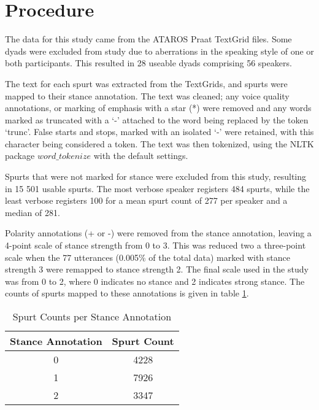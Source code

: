 \section{Procedure} 

The data for this study came from the ATAROS Praat \citep{boersma2002praat} TextGrid files.  Some dyads were excluded from study due to aberrations in the speaking style of one or both participants.  This resulted in 28 useable dyads comprising 56 speakers. 

The text for each spurt was extracted from the TextGrids, and spurts were mapped to their stance annotation.  The text was cleaned; any voice quality annotations, or marking of emphasis with a star (*) were removed and any words marked as truncated with a `-' attached to the word being replaced by the token `trunc'.  False starts and stops, marked with an isolated `-' were retained, with this character being considered a token.  The text was then tokenized, using the NLTK \citep{loper2005natural} package $word\_tokenize$  with the default settings.  

Spurts that were not marked for stance were excluded from this study, resulting in 15 501 usable spurts.  The most verbose speaker registers 484 spurts, while the least verbose registers 100 for a mean spurt count of 277 per speaker and a median of 281.

Polarity annotations (+ or -) were removed from the stance annotation, leaving a 4-point scale of stance strength from 0 to 3.  This was reduced two a three-point scale when the 77 utterances (0.005\% of the total data) marked with stance strength 3 were remapped to stance strength 2.  The final scale used in the study was from 0 to 2, where 0 indicates no stance and 2 indicates strong stance.  The counts of spurts mapped to these annotations is given in table \ref{tab:spurt_counts}.  

\begin{table}[H]
\centering
\begin{tabular}{c | c}
	\textbf{Stance Annotation} & \textbf{Spurt Count} \\ 
	\hline
	0                 & 4228 \\
	1                 & 7926 \\ 
	2                 & 3347 \\ 
\end{tabular}
\caption{Spurt Counts per Stance Annotation} 
\label{tab:spurt_counts} 
\end{table}


